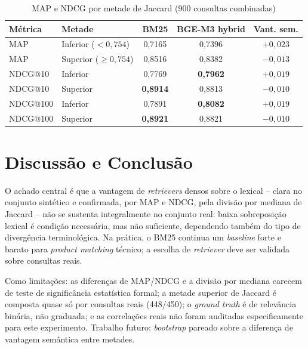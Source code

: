 \documentclass[12pt]{article}
\begin{document}
\begin{table}[ht]
\centering
\small
\caption{MAP e NDCG por metade de Jaccard (900 consultas combinadas)}
\label{tab:split}
\begin{tabular}{|l|l|c|c|c|}
\hline
\textbf{M\'etrica} & \textbf{Metade} & \textbf{BM25} & \textbf{BGE-M3 hybrid} & \textbf{Vant. sem.} \\
\hline
MAP & Inferior ($<0{,}754$) & 0,7165 & 0,7396 & $+0{,}023$ \\
\hline
MAP & Superior ($\geq0{,}754$) & 0,8516 & 0,8382 & $-0{,}013$ \\
\hline
NDCG@10 & Inferior & 0,7769 & \textbf{0,7962} & $+0{,}019$ \\
\hline
NDCG@10 & Superior & \textbf{0,8914} & 0,8813 & $-0{,}010$ \\
\hline
NDCG@100 & Inferior & 0,7891 & \textbf{0,8082} & $+0{,}019$ \\
\hline
NDCG@100 & Superior & \textbf{0,8921} & 0,8821 & $-0{,}010$ \\
\hline
\end{tabular}
\end{table}

\section{Discuss\~ao e Conclus\~ao}

O achado central \'e que a vantagem de \emph{retrievers} densos sobre o lexical -- clara no conjunto sint\'etico e confirmada, por MAP e NDCG, pela divis\~ao por mediana de Jaccard -- n\~ao se sustenta integralmente no conjunto real: baixa sobreposi\c{c}\~ao lexical \'e condi\c{c}\~ao necess\'aria, mas n\~ao suficiente, dependendo tamb\'em do tipo de diverg\^encia terminol\'ogica. Na pr\'atica, o BM25 continua um \emph{baseline} forte e barato para \emph{product matching} t\'ecnico; a escolha de \emph{retriever} deve ser validada sobre consultas reais.

Como limita\c{c}\~oes: as diferen\c{c}as de MAP/NDCG e a divis\~ao por mediana carecem de teste de signific\^ancia estat\'istica formal; a metade superior de Jaccard \'e composta quase s\'o por consultas reais (448/450); o \emph{ground truth} \'e de relev\^ancia bin\'aria, n\~ao graduada; e as correla\c{c}\~oes reais n\~ao foram auditadas especificamente para este experimento. Trabalho futuro: \emph{bootstrap} pareado sobre a diferen\c{c}a de vantagem sem\^antica entre metades.



\end{document}
